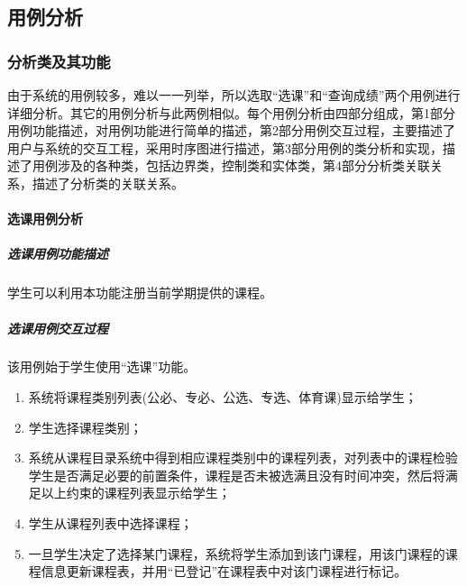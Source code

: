 \subsection{用例分析}
\subsubsection{分析类及其功能}
由于系统的用例较多，难以一一列举，所以选取“选课”和“查询成绩”两个用例进行详细分析。其它的用例分析与此两例相似。每个用例分析由四部分组成，第1部分用例功能描述，对用例功能进行简单的描述，第2部分用例交互过程，主要描述了用户与系统的交互工程，采用时序图进行描述，第3部分用例的类分析和实现，描述了用例涉及的各种类，包括边界类，控制类和实体类，第4部分分析类关联关系，描述了分析类的关联关系。

\paragraph{选课用例分析}
\subparagraph{选课用例功能描述}
学生可以利用本功能注册当前学期提供的课程。

\subparagraph{选课用例交互过程}
    
该用例始于学生使用“选课”功能。
    
\begin{enumerate}
  \item 系统将课程类别列表(公必、专必、公选、专选、体育课)显示给学生；
  \item 学生选择课程类别；
  \item 系统从课程目录系统中得到相应课程类别中的课程列表，对列表中的课程检验学生是否满足必要的前置条件，课程是否未被选满且没有时间冲突，然后将满足以上约束的课程列表显示给学生；
  \item 学生从课程列表中选择课程；
  \item 一旦学生决定了选择某门课程，系统将学生添加到该门课程，用该门课程的课程信息更新课程表，并用“已登记”在课程表中对该门课程进行标记。
\end{enumerate}
    
